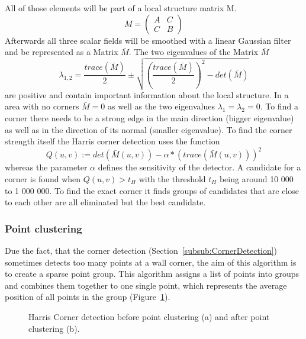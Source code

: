 All of those elements will be part of a local structure matrix M.
\begin{equation}M = \begin{pmatrix} A & C \\ C & B \end{pmatrix}\end{equation}
Afterwards all three scalar fields will be smoothed with a linear Gaussian filter and be represented as a Matrix $\bar{M}$.
The two eigenvalues of the Matrix $\bar{M}$
\begin{equation}\lambda_{1,2} = \dfrac{trace(\bar{M})}{2} \pm \sqrt{(\dfrac{trace(\bar{M})}{2})^2 - det(\bar{M})} \end{equation}
are positive and contain important information about the local structure. In a area with no corners $\bar{M} = 0$  as well as the two eigenvalues $\lambda_1 = \lambda_2 = 0$. To find a corner there needs to be a strong edge in the main direction (bigger eigenvalue) as well as in the direction of its normal (smaller eigenvalue). 
To find the corner strength itself the Harris corner detection uses the function 
\begin{equation}Q(u,v) := det(\bar{M}(u,v)) - \alpha * (trace(\bar{M}(u,v)))^2\end{equation}
whereas the parameter $\alpha$ defines the sensitivity of the detector. A candidate for a corner is found when
$Q(u,v) > t_H$
with the threshold $t_{H}$ being around 10 000 to 1 000 000. To find the exact corner it finds groups of candidates that are close to each other are all eliminated but the best candidate.

\subsubsection{Point clustering}
Due the fact, that the corner detection (Section~\ref{subsub:CornerDetection}) sometimes detects too many points at a wall corner, the aim of this algorithm is to create a sparse point group. This algorithm assigns a list of points into groups and combines them together to one single point, which represents the average position of all points in the group (Figure~\ref{fig:HCPointClustering}).

\begin{figure}[h!]
	\centering
	\hfill
	\caption{Harris Corner detection before point clustering (a) and after point clustering (b).}
	\label{fig:HCPointClustering}
\end{figure}

